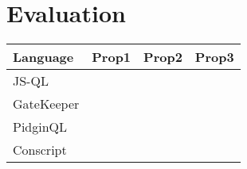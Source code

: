 \section{Evaluation}
\label{sec:ValidationEvaluation}

\begin{center}
    \begin{tabular}{ | l || l | l | l |}
    \hline
    Language & Prop1 & Prop2 & Prop3 \\ \hline
    JS-QL &  &  & \\ \hline
    GateKeeper &  &  & \\ \hline
    PidginQL &  &  & \\ \hline
    Conscript &  &  & \\ \hline
    \end{tabular}
\end{center}
